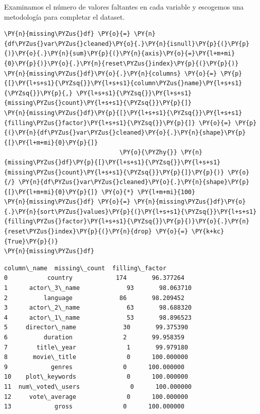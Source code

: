 Examinamos el número de valores faltantes en cada variable y escogemos
una metodología para completar el dataset.

    \begin{tcolorbox}[breakable, size=fbox, boxrule=1pt, pad at break*=1mm,colback=cellbackground, colframe=cellborder]
\begin{Verbatim}[commandchars=\\\{\}]
\PY{n}{missing\PYZus{}df} \PY{o}{=} \PY{n}{df\PYZus{}var\PYZus{}cleaned}\PY{o}{.}\PY{n}{isnull}\PY{p}{(}\PY{p}{)}\PY{o}{.}\PY{n}{sum}\PY{p}{(}\PY{n}{axis}\PY{o}{=}\PY{l+m+mi}{0}\PY{p}{)}\PY{o}{.}\PY{n}{reset\PYZus{}index}\PY{p}{(}\PY{p}{)}
\PY{n}{missing\PYZus{}df}\PY{o}{.}\PY{n}{columns} \PY{o}{=} \PY{p}{[}\PY{l+s+s1}{\PYZsq{}}\PY{l+s+s1}{column\PYZus{}name}\PY{l+s+s1}{\PYZsq{}}\PY{p}{,} \PY{l+s+s1}{\PYZsq{}}\PY{l+s+s1}{missing\PYZus{}count}\PY{l+s+s1}{\PYZsq{}}\PY{p}{]}
\PY{n}{missing\PYZus{}df}\PY{p}{[}\PY{l+s+s1}{\PYZsq{}}\PY{l+s+s1}{filling\PYZus{}factor}\PY{l+s+s1}{\PYZsq{}}\PY{p}{]} \PY{o}{=} \PY{p}{(}\PY{n}{df\PYZus{}var\PYZus{}cleaned}\PY{o}{.}\PY{n}{shape}\PY{p}{[}\PY{l+m+mi}{0}\PY{p}{]} 
                                \PY{o}{\PYZhy{}} \PY{n}{missing\PYZus{}df}\PY{p}{[}\PY{l+s+s1}{\PYZsq{}}\PY{l+s+s1}{missing\PYZus{}count}\PY{l+s+s1}{\PYZsq{}}\PY{p}{]}\PY{p}{)} \PY{o}{/} \PY{n}{df\PYZus{}var\PYZus{}cleaned}\PY{o}{.}\PY{n}{shape}\PY{p}{[}\PY{l+m+mi}{0}\PY{p}{]} \PY{o}{*} \PY{l+m+mi}{100}
\PY{n}{missing\PYZus{}df} \PY{o}{=} \PY{n}{missing\PYZus{}df}\PY{o}{.}\PY{n}{sort\PYZus{}values}\PY{p}{(}\PY{l+s+s1}{\PYZsq{}}\PY{l+s+s1}{filling\PYZus{}factor}\PY{l+s+s1}{\PYZsq{}}\PY{p}{)}\PY{o}{.}\PY{n}{reset\PYZus{}index}\PY{p}{(}\PY{n}{drop} \PY{o}{=} \PY{k+kc}{True}\PY{p}{)}
\PY{n}{missing\PYZus{}df}
\end{Verbatim}
\end{tcolorbox}

            \begin{tcolorbox}[breakable, boxrule=.5pt, size=fbox, pad at break*=1mm, opacityfill=0]
\begin{Verbatim}[commandchars=\\\{\}]
        column\_name  missing\_count  filling\_factor
0           country            174       96.377264
1      actor\_3\_name             93       98.063710
2          language             86       98.209452
3      actor\_2\_name             63       98.688320
4      actor\_1\_name             53       98.896523
5     director\_name             30       99.375390
6          duration              2       99.958359
7        title\_year              1       99.979180
8       movie\_title              0      100.000000
9            genres              0      100.000000
10    plot\_keywords              0      100.000000
11  num\_voted\_users              0      100.000000
12     vote\_average              0      100.000000
13            gross              0      100.000000
\end{Verbatim}
\end{tcolorbox}
        
